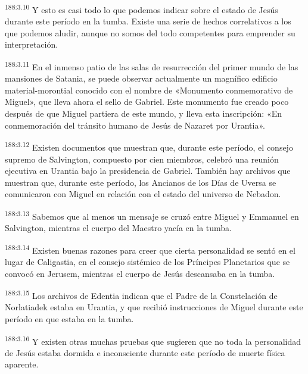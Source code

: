 \par 
\textsuperscript{188:3.10} Y esto es casi todo lo que podemos indicar sobre el estado de Jesús durante este período en la tumba. Existe una serie de hechos correlativos a los que podemos aludir, aunque no somos del todo competentes para emprender su interpretación.

\par 
\textsuperscript{188:3.11} En el inmenso patio de las salas de resurrección del primer mundo de las mansiones de Satania, se puede observar actualmente un magnífico edificio material-morontial conocido con el nombre de «Monumento conmemorativo de Miguel», que lleva ahora el sello de Gabriel. Este monumento fue creado poco después de que Miguel partiera de este mundo, y lleva esta inscripción: «En conmemoración del tránsito humano de Jesús de Nazaret por Urantia».

\par 
\textsuperscript{188:3.12} Existen documentos que muestran que, durante este período, el consejo supremo de Salvington, compuesto por cien miembros, celebró una reunión ejecutiva en Urantia bajo la presidencia de Gabriel. También hay archivos que muestran que, durante este período, los Ancianos de los Días de Uversa se comunicaron con Miguel en relación con el estado del universo de Nebadon.

\par 
\textsuperscript{188:3.13} Sabemos que al menos un mensaje se cruzó entre Miguel y Emmanuel en Salvington, mientras el cuerpo del Maestro yacía en la tumba.

\par 
\textsuperscript{188:3.14} Existen buenas razones para creer que cierta personalidad se sentó en el lugar de Caligastia, en el consejo sistémico de los Príncipes Planetarios que se convocó en Jerusem, mientras el cuerpo de Jesús descansaba en la tumba.

\par 
\textsuperscript{188:3.15} Los archivos de Edentia indican que el Padre de la Constelación de Norlatiadek estaba en Urantia, y que recibió instrucciones de Miguel durante este período en que estaba en la tumba.

\par 
\textsuperscript{188:3.16} Y existen otras muchas pruebas que sugieren que no toda la personalidad de Jesús estaba dormida e inconsciente durante este período de muerte física aparente.


